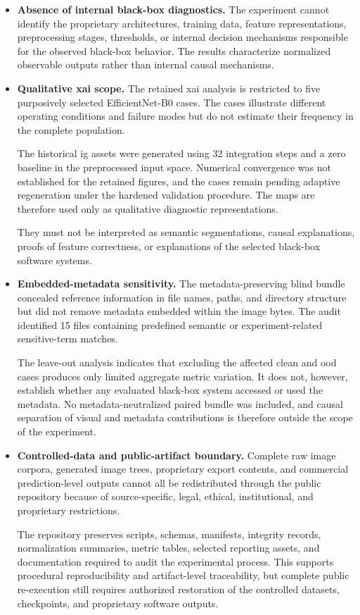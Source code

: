 \begin{itemize}
\item \textbf{Absence of internal black-box diagnostics.}
The experiment cannot identify the proprietary architectures, training data,
feature representations, preprocessing stages, thresholds, or internal
decision mechanisms responsible for the observed black-box behavior. The
results characterize normalized observable outputs rather than internal causal
mechanisms.

\item \textbf{Qualitative \gls{xai} scope.}
The retained \gls{xai} analysis is restricted to five purposively selected
EfficientNet-B0 cases. The cases illustrate different operating conditions and
failure modes but do not estimate their frequency in the complete population.

The historical \gls{ig} assets were generated using 32 integration steps and a
zero baseline in the preprocessed input space. Numerical convergence was not
established for the retained figures, and the cases remain pending adaptive
regeneration under the hardened validation procedure. The maps are therefore
used only as qualitative diagnostic representations.

They must not be interpreted as semantic segmentations, causal explanations,
proofs of feature correctness, or explanations of the selected black-box
software systems.

\item \textbf{Embedded-metadata sensitivity.}
The metadata-preserving blind bundle concealed reference information in file
names, paths, and directory structure but did not remove metadata embedded
within the image bytes. The audit identified 15 files containing predefined
semantic or experiment-related sensitive-term matches.

The leave-out analysis indicates that excluding the affected clean and
\gls{ood} cases produces only limited aggregate metric variation. It does not,
however, establish whether any evaluated black-box system accessed or used the
metadata. No metadata-neutralized paired bundle was included, and causal
separation of visual and metadata contributions is therefore outside the scope
of the experiment.

\item \textbf{Controlled-data and public-artifact boundary.}
Complete raw image corpora, generated image trees, proprietary export contents,
and commercial prediction-level outputs cannot all be redistributed through
the public repository because of source-specific, legal, ethical,
institutional, and proprietary restrictions.

The repository preserves scripts, schemas, manifests, integrity records,
normalization summaries, metric tables, selected reporting assets, and
documentation required to audit the experimental process. This supports
procedural reproducibility and artifact-level traceability, but complete public
re-execution still requires authorized restoration of the controlled datasets,
checkpoints, and proprietary software outputs.

\end{itemize}

